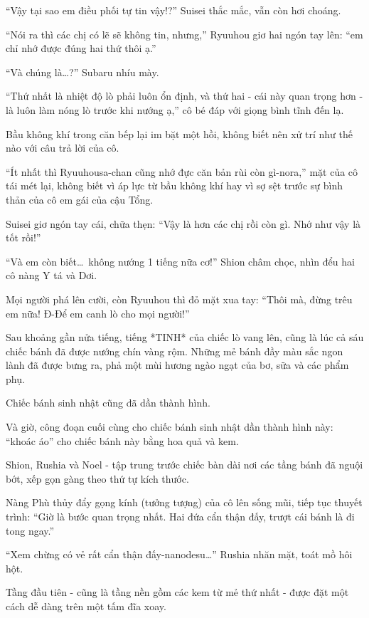 \documentclass[../main.tex]{subfiles}
\begin{document}
``Vậy tại sao em điều phối tự tin vậy!?'' Suisei thắc mắc, vẫn còn hơi choáng.

``Nói ra thì các chị có lẽ sẽ không tin, nhưng,'' Ryuuhou giơ hai ngón tay lên: ``em chỉ nhớ được đúng hai thứ thôi ạ.''

``Và chúng là\dots?'' Subaru nhíu mày.

``Thứ nhất là nhiệt độ lò phải luôn ổn định, và thứ hai - cái này quan trọng hơn - là luôn làm nóng lò trước khi nướng ạ,'' cô bé đáp với giọng bình tĩnh đến lạ.

Bầu không khí trong căn bếp lại im bặt một hồi, không biết nên xử trí như thế nào với câu trả lời của cô.

``Ít nhất thì Ryuuhousa-chan cũng nhớ đực căn bản rùi còn gì-nora,'' mặt của cô tái mét lại, không biết vì áp lực từ bầu không khí hay vì sợ sệt trước sự bình thản của cô em gái của cậu Tổng.

Suisei giơ ngón tay cái, chữa thẹn: ``Vậy là hơn các chị rồi còn gì. Nhớ như vậy là tốt rồi!''

``Và em còn biết\dots\ không nướng 1 tiếng nữa cơ!'' Shion châm chọc, nhìn đểu hai cô nàng Y tá và Dơi.

Mọi người phá lên cười, còn Ryuuhou thì đỏ mặt xua tay: ``Thôi mà, đừng trêu em nữa! Đ-Để em canh lò cho mọi người!''

Sau khoảng gần nửa tiếng, tiếng *TINH* của chiếc lò vang lên, cũng là lúc cả sáu chiếc bánh đã được nướng chín vàng rộm. Những mẻ bánh đầy màu sắc ngon lành đã được bưng ra, phả một mùi hương ngào ngạt của bơ, sữa và các phẩm phụ.

Chiếc bánh sinh nhật cũng đã dần thành hình.

\ct

Và giờ, công đoạn cuối cùng cho chiếc bánh sinh nhật dần thành hình này: ``khoác áo'' cho chiếc bánh này bằng hoa quả và kem.

Shion, Rushia và Noel - tập trung trước chiếc bàn dài nơi các tầng bánh đã nguội bớt, xếp gọn gàng theo thứ tự kích thước.

Nàng Phù thủy đẩy gọng kính (tưởng tượng) của cô lên sống mũi, tiếp tục thuyết trình: ``Giờ là bước quan trọng nhất. Hai đứa cẩn thận đấy, trượt cái bánh là đi tong ngay.''

``Xem chừng có vẻ rất cẩn thận đấy-nanodesu\dots'' Rushia nhăn mặt, toát mồ hôi hột.

Tầng đầu tiên - cũng là tầng nền gồm các kem từ mẻ thứ nhất - được đặt một cách dễ dàng trên một tấm đĩa xoay.
\end{document}
